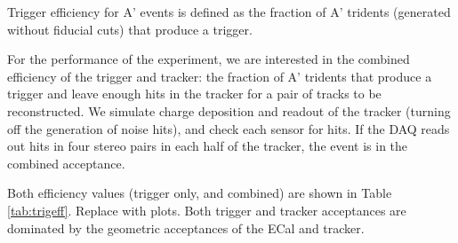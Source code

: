 Trigger efficiency for A' events is defined as the fraction of A' tridents (generated without fiducial cuts) that produce a trigger.

For the performance of the experiment, we are interested in the combined efficiency of the trigger and tracker: the fraction of A' tridents that produce a trigger and leave enough hits in the tracker for a pair of tracks to be reconstructed.
We simulate charge deposition and readout of the tracker (turning off the generation of noise hits), and check each sensor for hits. 
If the DAQ reads out hits in four stereo pairs in each half of the tracker, the event is in the combined acceptance.

Both efficiency values (trigger only, and combined) are shown in Table \ref{tab:trigeff}. {\color{red} Replace with plots.} 
Both trigger and tracker acceptances are dominated by the geometric acceptances of the ECal and tracker.

